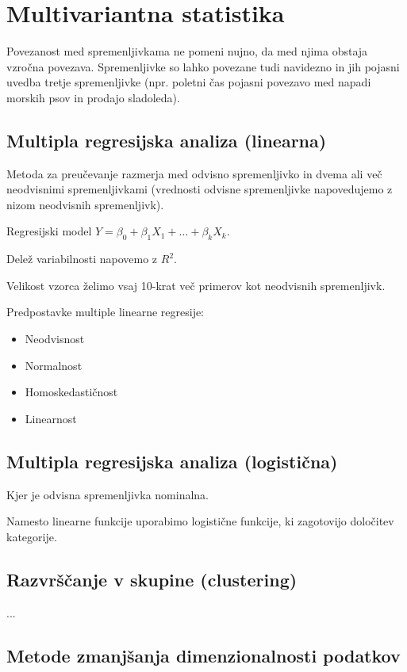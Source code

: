 \section{Multivariantna statistika}

Povezanost med spremenljivkama ne pomeni nujno, da med njima obstaja vzročna povezava. Spremenljivke so lahko povezane tudi navidezno in jih pojasni uvedba tretje spremenljivke (npr. poletni čas pojasni povezavo med napadi morskih psov in prodajo sladoleda).

\subsection*{Multipla regresijska analiza (linearna)}

Metoda za preučevanje razmerja med odvisno spremenljivko in dvema ali več neodvisnimi spremenljivkami (vrednosti odvisne spremenljivke napovedujemo z nizom neodvisnih spremenljivk).

Regresijski model $Y=\beta_0 +\beta_1 X_1 + \ldots + \beta_k X_k$.

Delež variabilnosti napovemo z $R^2$.

Velikost vzorca želimo vsaj 10-krat več primerov kot neodvisnih spremenljivk.

Predpostavke multiple linearne regresije:
\begin{itemize}
    \item Neodvisnost
    \item Normalnost
    \item Homoskedastičnost
    \item Linearnost
\end{itemize}

\subsection*{Multipla regresijska analiza (logistična)}

Kjer je odvisna spremenljivka nominalna.

Namesto linearne funkcije uporabimo logistične funkcije, ki zagotovijo določitev kategorije.

\subsection*{Razvrščanje v skupine (clustering)}

...

\subsection*{Metode zmanjšanja dimenzionalnosti podatkov}

